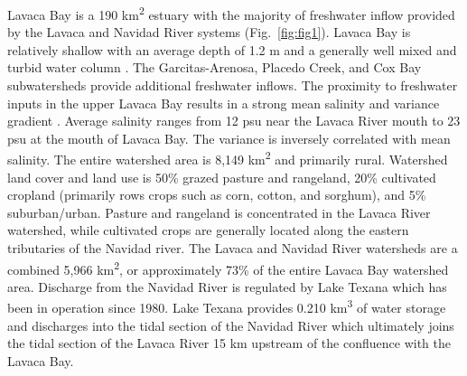 \documentclass[fleqn,10pt,lineno]{wlpeerj} %
\begin{document}
Lavaca Bay is a 190 km\textsuperscript{2} estuary with the majority of
freshwater inflow provided by the Lavaca and Navidad River systems
(Fig.~\ref{fig:fig1}). Lavaca Bay is relatively shallow with an average
depth of 1.2 m and a generally well mixed and turbid water column
\autocite{beserespollackLongtermTrendsResponse2011,montagnaAssessmentRelationshipFreshwater2020}.
The Garcitas-Arenosa, Placedo Creek, and Cox Bay subwatersheds provide
additional freshwater inflows. The proximity to freshwater inputs in the
upper Lavaca Bay results in a strong mean salinity and variance gradient
\autocite{montagnaAssessmentRelationshipFreshwater2020}. Average
salinity ranges from 12 psu near the Lavaca River mouth to 23 psu at the
mouth of Lavaca Bay. The variance is inversely correlated with mean
salinity. The entire watershed area is 8,149 km\textsuperscript{2} and
primarily rural. Watershed land cover and land use is 50\% grazed
pasture and rangeland, 20\% cultivated cropland (primarily rows crops
such as corn, cotton, and sorghum), and 5\% suburban/urban. Pasture and
rangeland is concentrated in the Lavaca River watershed, while
cultivated crops are generally located along the eastern tributaries of
the Navidad river. The Lavaca and Navidad River watersheds are a
combined 5,966 km\textsuperscript{2}, or approximately 73\% of the
entire Lavaca Bay watershed area. Discharge from the Navidad River is
regulated by Lake Texana which has been in operation since 1980. Lake
Texana provides 0.210 km\textsuperscript{3} of water storage and
discharges into the tidal section of the Navidad River which ultimately
joins the tidal section of the Lavaca River 15 km upstream of the
confluence with the Lavaca Bay.
\end{document}
